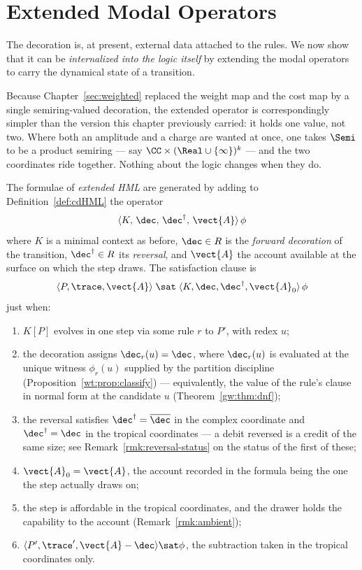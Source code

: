 \chapter{Extended Modal Operators}
\label{sec:extended-modal}

The decoration is, at present, external data attached to the rules.  We
now show that it can be \emph{internalized into the logic itself} by
extending the modal operators to carry the dynamical state of a
transition.

Because Chapter~\ref{sec:weighted} replaced the weight map and the cost
map by a single semiring-valued decoration, the extended operator is
correspondingly simpler than the version this chapter previously carried:
it holds one value, not two.  Where both an amplitude and a charge are
wanted at once, one takes $\Semi$ to be a product semiring --- say
$\CC \times (\Real\cup\{\infty\})^k$ --- and the two coordinates ride
together.  Nothing about the logic changes when they do.

\begin{definition}
\label{def:ext-modal}
The formulae of \emph{extended HML} are generated by adding to
Definition~\ref{def:cdHML} the operator
\[
  \langle K,\, \dec,\, \dec^{\dagger},\, \vect{A} \rangle\,\phi
\]
where $K$ is a minimal context as before, $\dec \in R$ is the
\emph{forward decoration} of the transition, $\dec^{\dagger} \in R$ its
\emph{reversal}, and $\vect{A}$ the account available at the surface on
which the step draws.  The satisfaction clause is
\[
  \langle P, \trace, \vect{A} \rangle \;\sat\;
  \langle K, \dec, \dec^{\dagger}, \vect{A}_0 \rangle\,\phi
\]
just when:
\begin{enumerate}[label=(\roman*)]
  \item $K[P]$ evolves in one step via some rule $r$ to $P'$, with redex
        $u$;
  \item the decoration assigns $\dec_r(u) = \dec$, where $\dec_r(u)$ is
        evaluated at the unique witness $\phi_r(u)$ supplied by the
        partition discipline (Proposition~\ref{wt:prop:classify}) ---
        equivalently, the value of the rule's clause in normal form at
        the candidate $u$ (Theorem~\ref{gw:thm:dnf});
  \item the reversal satisfies $\dec^{\dagger} = \overline{\dec}$ in the
        complex coordinate and $\dec^{\dagger} = \dec$ in the tropical
        coordinates --- a debit reversed is a credit of the same size;
        see Remark~\ref{rmk:reversal-status} on the status of the first
        of these;
  \item $\vect{A}_0 = \vect{A}$, the account recorded in the formula being
        the one the step actually draws on;
  \item the step is affordable in the tropical coordinates, and the drawer
        holds the capability to the account (Remark~\ref{rmk:ambient});
  \item $\langle P', \trace', \vect{A} - \dec \rangle \sat \phi$, the
        subtraction taken in the tropical coordinates only.
\end{enumerate}
\end{definition}

